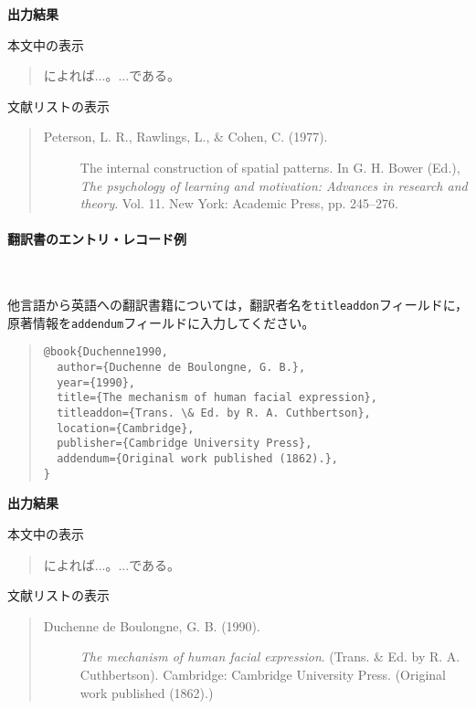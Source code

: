 \documentclass[12pt]{ltjsarticle}
\begin{document}
\textbf{出力結果}

本文中の表示
\begin{quote}
\textcite{Peterson1977}によれば...。...である\parencite{Peterson1977}。
\end{quote}

文献リストの表示
\begin{quote}
\begin{description}
  \item[\textrm{Peterson, L. R., Rawlings, L., \& Cohen, C. (1977).}]The internal construction of spatial patterns. In G. H. Bower (Ed.), \textit{The psychology of learning and motivation: Advances in research and theory}. Vol. 11. New York: Academic Press, pp. 245--276.
\end{description}
\end{quote}

\paragraph{翻訳書のエントリ・レコード例}　

他言語から英語への翻訳書籍については，翻訳者名を\texttt{titleaddon}フィールドに，原著情報を\texttt{addendum}フィールドに入力してください。

\begin{quote}
\begin{verbatim}
@book{Duchenne1990, 
  author={Duchenne de Boulongne, G. B.},
  year={1990},
  title={The mechanism of human facial expression},
  titleaddon={Trans. \& Ed. by R. A. Cuthbertson},
  location={Cambridge},
  publisher={Cambridge University Press},
  addendum={Original work published (1862).},
} 
\end{verbatim}
\end{quote}

\textbf{出力結果}

本文中の表示
\begin{quote}
\textcite{Duchenne1990}によれば...。...である\parencite{Duchenne1990}。
\end{quote}

文献リストの表示
\begin{quote}
\begin{description}
  \item[\textrm{Duchenne de Boulongne, G. B. (1990).}]\textit{The mechanism of human facial expression}. (Trans. \& Ed. by R. A. Cuthbertson). Cambridge: Cambridge University Press. (Original work published (1862).)
\end{description}
\end{quote}
\end{document}
